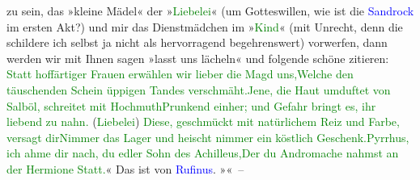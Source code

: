                zu sein, das »kleine Mädel« der »\textcolor{green}{Liebelei}{}\ledrightnote{\textcolor{green}{Liebelei. Schauspiel in drei Akten}}« (um
               Gotteswillen, wie ist die \textcolor{blue}{Sandrock}{}\ledrightnote{\textcolor{blue}{Adele Sandrock}} im ersten
               Akt?) und mir das Dienstmädchen im »\textcolor{green}{Kind}{}\ledrightnote{\textcolor{green}{Das Kind}}« (mit
               Unrecht, denn die schildere ich selbst ja nicht als hervorragend begehrenswert)
               vorwerfen, dann wer{\pb}den wir mit Ihnen sagen »lasst uns
               lächeln« und folgende schöne \label{K_L00493_4v}\label{K_L00493_4h} zitieren:\pend
           \stanza{}\textcolor{green}{Statt hoffärtiger Frauen erwählen
                     wir lieber die Magd uns,}{}\newverse{}\textcolor{green}{Welche den täuschenden Schein
                     üppigen Tandes verschmäht.}{}\newverse{}\textcolor{green}{Jene, die Haut umduftet von Salböl,
                     schreitet mit Hochmuth}{}\newverse{}\textcolor{green}{Prunkend einher; und Gefahr bringt
                     es, ihr liebend zu nahn.}{} (\textcolor{green}{Liebelei}{}\ledrightnote{\textcolor{green}{Liebelei. Schauspiel in drei Akten}}) \newverse{}\textcolor{green}{Diese, geschmückt mit natürlichem
                     Reiz und Farbe, versagt dir}{}\newverse{}\textcolor{green}{Nimmer das Lager und heischt nimmer
                     ein köstlich Geschenk.}{}\newverse{}\textcolor{green}{Pyrrhus, ich ahme dir nach, du
                     edler Sohn des Achilleus,}{}\newverse{}\textcolor{green}{Der du Andromache nahmst an der
                     Hermione Statt.}{}«\stanzaend{}\pstart
           Das ist von \textcolor{blue}{Rufinus}{}\ledrightnote{\textcolor{blue}{Rufinus}}. »\label{K_L00493_5v}\label{K_L00493_5h}« –\pend
